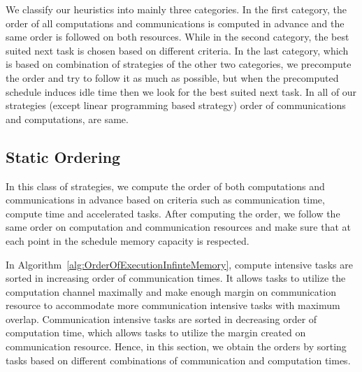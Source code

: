\documentclass[sigconf]{acmart}
\begin{document}
	
	We classify our heuristics into mainly three categories. In the first category, the order of all computations and communications is computed in advance and the same order is followed on both resources. While in the second category, the best suited next task is chosen based on different criteria. In the last category, which is based on combination of strategies of the other two categories, we precompute the order and try to follow it as much as possible, but when the precomputed schedule induces idle time then we look for the best suited next task. In all of our strategies (except linear programming based strategy) order of communications and computations, are same.
	
	\subsection{Static Ordering}
	In this class of strategies, we compute the order of both computations and communications in advance based on criteria such as communication time, compute time and accelerated tasks. After computing the order, we follow the same order on computation and communication resources and make sure that at each point in the schedule memory capacity is respected.
	
	
	In Algorithm~\ref{alg:OrderOfExecutionInfinteMemory}, compute intensive tasks  are sorted in increasing order of communication times. It allows tasks to utilize the computation channel maximally and make enough margin on communication resource to accommodate more communication intensive tasks with maximum overlap. Communication intensive tasks are sorted in decreasing order of computation time, which allows tasks to utilize the margin created on communication resource. Hence,  in this section, we obtain the orders by sorting tasks based on different combinations of communication and computation times.
	
\end{document}
